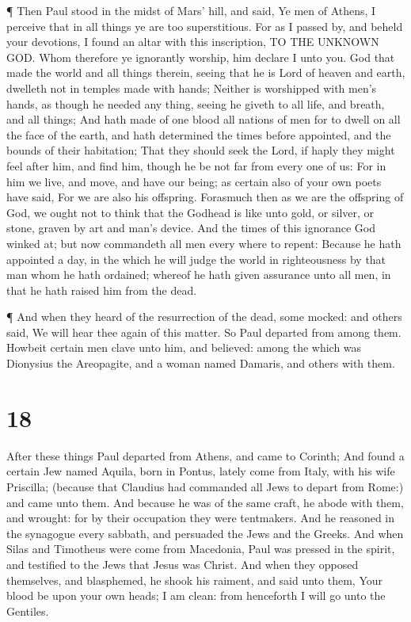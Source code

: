  ¶ Then Paul stood in the midst of Mars' hill, and said, Ye
men of Athens, I perceive that in all things ye are too superstitious.
 For as I passed by, and beheld your devotions, I found an
altar with this inscription, TO THE UNKNOWN GOD. Whom therefore ye
ignorantly worship, him declare I unto you.  God that made
the world and all things therein, seeing that he is Lord of heaven and
earth, dwelleth not in temples made with hands;  Neither is
worshipped with men's hands, as though he needed any thing, seeing he
giveth to all life, and breath, and all things;  And hath
made of one blood all nations of men for to dwell on all the face of the
earth, and hath determined the times before appointed, and the bounds of
their habitation;  That they should seek the Lord, if haply
they might feel after him, and find him, though he be not far from every
one of us:  For in him we live, and move, and have our
being; as certain also of your own poets have said, For we are also his
offspring.  Forasmuch then as we are the offspring of God,
we ought not to think that the Godhead is like unto gold, or silver, or
stone, graven by art and man's device.  And the times of
this ignorance God winked at; but now commandeth all men every where to
repent:  Because he hath appointed a day, in the which he
will judge the world in righteousness by that man whom he hath ordained;
whereof he hath given assurance unto all men, in that he hath raised him
from the dead.

 ¶ And when they heard of the resurrection of the dead,
some mocked: and others said, We will hear thee again of this matter.
 So Paul departed from among them.  Howbeit
certain men clave unto him, and believed: among the which was Dionysius
the Areopagite, and a woman named Damaris, and others with them.

\hypertarget{section-17}{%
\section{18}\label{section-17}}

 After these things Paul departed from Athens, and came to
Corinth;  And found a certain Jew named Aquila, born in
Pontus, lately come from Italy, with his wife Priscilla; (because that
Claudius had commanded all Jews to depart from Rome:) and came unto
them.  And because he was of the same craft, he abode with
them, and wrought: for by their occupation they were tentmakers.
 And he reasoned in the synagogue every sabbath, and
persuaded the Jews and the Greeks.  And when Silas and
Timotheus were come from Macedonia, Paul was pressed in the spirit, and
testified to the Jews that Jesus was Christ.  And when they
opposed themselves, and blasphemed, he shook his raiment, and said unto
them, Your blood be upon your own heads; I am clean: from henceforth I
will go unto the Gentiles.

